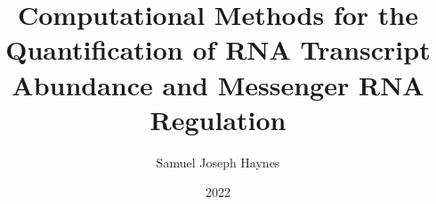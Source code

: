 \documentclass{SBCbookchapter}
\begin{document}
\title{Computational Methods for the Quantification of RNA Transcript Abundance and Messenger RNA Regulation}
\author{Samuel Joseph Haynes}
\date{2022}
\makethesistitle

\newpage

\renewcommand{\thepage}{\roman{page}}


\vspace*{\fill}

%

\newpage



\newpage


%

\newpage


%

\newpage


%

\newpage


\newpage

\end{document}
